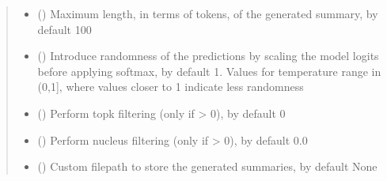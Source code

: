 \documentclass[letterpaper,10pt,english]{sphinxmanual}
\begin{document}
\begin{fulllineitems}
\begin{fulllineitems}
\begin{quote}
\begin{description}
\begin{itemize}
\item {} 
\sphinxAtStartPar
{} (\sphinxstyleliteralemphasis{\sphinxupquote{, }}) \textendash{} Maximum length, in terms of tokens, of the generated summary, by default 100

\item {} 
\sphinxAtStartPar
{} (\sphinxstyleliteralemphasis{\sphinxupquote{, }}) \textendash{} Introduce randomness of the predictions by scaling the model logits before
applying softmax, by default 1. Values for temperature range in (0,1{]}, where
values closer to 1 indicate less randomness

\item {} 
\sphinxAtStartPar
{} (\sphinxstyleliteralemphasis{\sphinxupquote{, }}) \textendash{} Perform top\sphinxhyphen{}k filtering (only if  \textgreater{} 0), by default 0

\item {} 
\sphinxAtStartPar
{} (\sphinxstyleliteralemphasis{\sphinxupquote{, }}) \textendash{} Perform nucleus filtering (only if  \textgreater{} 0), by default 0.0

\item {} 
\sphinxAtStartPar
{} (\sphinxstyleliteralemphasis{\sphinxupquote{{[}}}\sphinxstyleliteralemphasis{\sphinxupquote{, }}\sphinxstyleliteralemphasis{\sphinxupquote{{]}}}\sphinxstyleliteralemphasis{\sphinxupquote{, }}) \textendash{} Custom filepath to store the generated summaries, by default None

\end{itemize}

\end{description}\end{quote}


\end{fulllineitems}
\end{fulllineitems}
\end{document}
